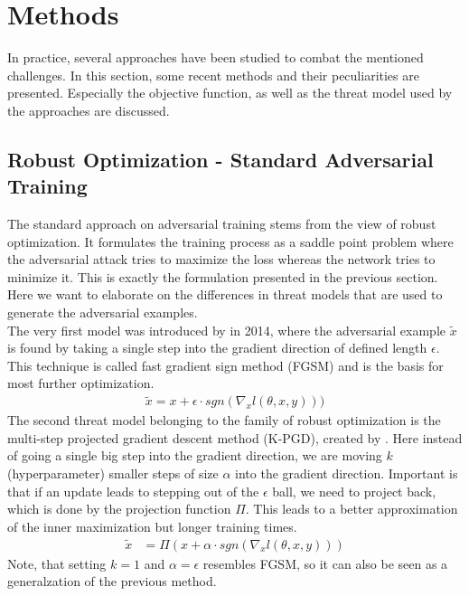 \documentclass{article}
\begin{document}
\section{Methods}
  
In practice, several approaches have been studied to combat the mentioned challenges. In this section, some recent methods and their peculiarities are presented. Especially the objective function, as well as the threat model used by the approaches are discussed.
  
\subsection{Robust Optimization - Standard Adversarial Training} \label{Robust Opti}
  
The standard approach on adversarial training stems from the view of robust optimization. It formulates the training process as a saddle point problem where the adversarial attack tries to maximize the loss whereas the network tries to minimize it. This is exactly the formulation presented in the previous section. Here we want to elaborate on the differences in threat models that are used to generate the adversarial examples. \\
The very first model was introduced by \cite{b9} in 2014, where the adversarial example $\tilde{x}$ is found by taking a single step into the gradient direction of defined length $\epsilon$. This technique is called fast gradient sign method (FGSM) and is the basis for most further optimization.
\begin{align*}
  \tilde{x} = x + \epsilon \cdot sgn(\nabla_x l(\theta,x,y)))
\end{align*}
The second threat model belonging to the family of robust optimization is the multi-step projected gradient descent method (K-PGD), created by \cite{b28}. Here instead of going a single big step into the gradient direction, we are moving $k$ (hyperparameter) smaller steps of size $\alpha$ into the gradient direction. Important is that if an update leads to stepping out of the $\epsilon$ ball, we need to project back, which is done by the projection function $\Pi$. This leads to a better approximation of the inner maximization but longer training times. 
\begin{align*}
    \tilde{x} &= \Pi (x + \alpha \cdot sgn(\nabla_x l(\theta,x,y)))
\end{align*}
Note, that setting $k=1$ and $\alpha=\epsilon$ resembles FGSM, so it can also be seen as a generalzation of the previous method. \\
\end{document}
